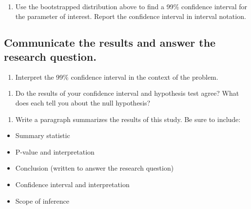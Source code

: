 \documentclass[
]{report}
\providecommand{\tightlist}{%
  \setlength{\itemsep}{0pt}\setlength{\parskip}{0pt}}
\begin{document}
\begin{enumerate}
\def\labelenumi{\arabic{enumi}.}
\setcounter{enumi}{18}
\tightlist
\item
  Use the bootstrapped distribution above to find a 99\% confidence interval for the parameter of interest. Report the confidence interval in interval notation.
\end{enumerate}

\vspace{.3in}

\hypertarget{communicate-the-results-and-answer-the-research-question.}{%
\subsection*{Communicate the results and answer the research question.}\label{communicate-the-results-and-answer-the-research-question.}}

\begin{enumerate}
\def\labelenumi{\arabic{enumi}.}
\setcounter{enumi}{19}
\tightlist
\item
  Interpret the 99\% confidence interval in the context of the problem.
\end{enumerate}

\vspace{.8in}

\begin{enumerate}
\def\labelenumi{\arabic{enumi}.}
\setcounter{enumi}{20}
\tightlist
\item
  Do the results of your confidence interval and hypothesis test agree? What does each tell you about the null hypothesis?
\end{enumerate}

\vspace{1in}

\newpage

\begin{enumerate}
\def\labelenumi{\arabic{enumi}.}
\setcounter{enumi}{21}
\tightlist
\item
  Write a paragraph summarizes the results of this study. Be sure to include:
\end{enumerate}

\begin{itemize}
\item
  Summary statistic
\item
  P-value and interpretation
\item
  Conclusion (written to answer the research question)
\item
  Confidence interval and interpretation
\item
  Scope of inference
\end{itemize}
\end{document}
